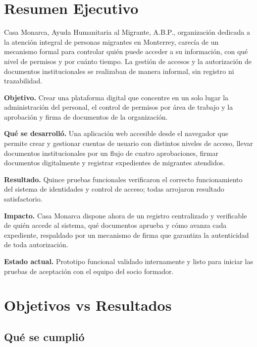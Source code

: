 \documentclass[10pt,letterpaper]{report}
\begin{document}

\chapter{Resumen Ejecutivo}

Casa Monarca, Ayuda Humanitaria al Migrante, A.B.P., organización dedicada a la atención integral de personas migrantes en Monterrey, carecía de un mecanismo formal para controlar quién puede acceder a su información, con qué nivel de permisos y por cuánto tiempo. La gestión de accesos y la autorización de documentos institucionales se realizaban de manera informal, sin registro ni trazabilidad.

\textbf{Objetivo.} Crear una plataforma digital que concentre en un solo lugar la administración del personal, el control de permisos por área de trabajo y la aprobación y firma de documentos de la organización.

\textbf{Qué se desarrolló.} Una aplicación web accesible desde el navegador que permite crear y gestionar cuentas de usuario con distintos niveles de acceso, llevar documentos institucionales por un flujo de cuatro aprobaciones, firmar documentos digitalmente y registrar expedientes de migrantes atendidos.

\textbf{Resultado.} Quince pruebas funcionales verificaron el correcto funcionamiento del sistema de identidades y control de acceso; todas arrojaron resultado satisfactorio.

\textbf{Impacto.} Casa Monarca dispone ahora de un registro centralizado y verificable de quién accede al sistema, qué documentos aprueba y cómo avanza cada expediente, respaldado por un mecanismo de firma que garantiza la autenticidad de toda autorización.

\textbf{Estado actual.} Prototipo funcional validado internamente y listo para iniciar las pruebas de aceptación con el equipo del socio formador.

\chapter{Objetivos vs Resultados}

\section{Qué se cumplió}
\end{document}

